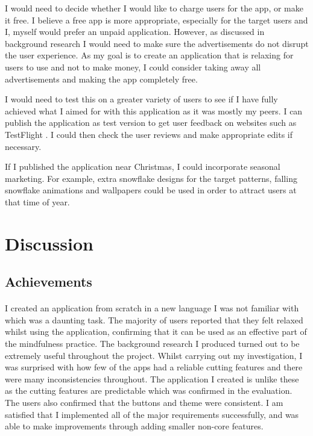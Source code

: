 \documentclass[11pt]{article}
\begin{document}
        I would need to decide whether I would like to charge users for the app, or make it free. I believe a free app is more appropriate, especially for the target users and I, myself would prefer an unpaid application. However, as discussed in background research I would need to make sure the advertisements do not disrupt the user experience. As my goal is to create an application that is relaxing for users to use and not to make money, I could consider taking away all advertisements and making the app completely free.
        
        I would need to test this on a greater variety of users to see if I have fully achieved what I aimed for with this application as it was mostly my peers.  I can publish the application as test version to get user feedback on websites such as TestFlight \cite{TestFlight}.
        I could then check the user reviews and make appropriate edits if necessary. 
        
        If I published the application near Christmas, I could incorporate seasonal marketing. For example, extra snowflake designs for the target patterns, falling snowflake animations and wallpapers could be used in order to attract users at that time of year.
        
\newpage
\section{Discussion}
    \subsection{Achievements}
        \paragraph{}
        I created an application from scratch in a new language I was not familiar with which was a daunting task. The majority of users reported that they felt relaxed whilst using the application, confirming that it can be used as an effective part of the mindfulness practice. The background research I produced turned out to be extremely useful throughout the project. Whilst carrying out my investigation, I was surprised with how few of the apps had a reliable cutting features and there were many inconsistencies throughout. The application I created is unlike these as the cutting features are predictable which was confirmed in the evaluation. The users also confirmed that the buttons and theme were consistent. I am satisfied that I implemented all of the major requirements successfully, and was able to make improvements through adding smaller non-core features.
        
\end{document}
